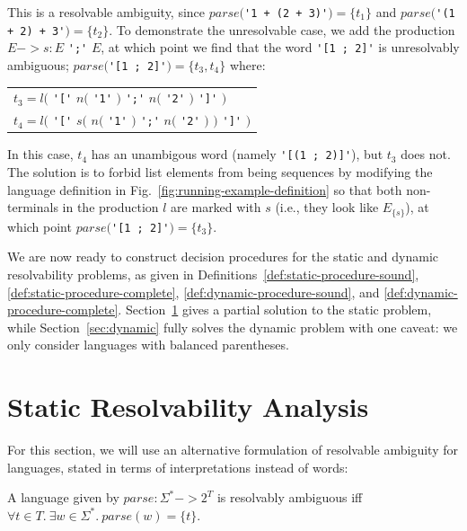 \documentclass[acmsmall,review,anonymous]{acmart}\settopmatter{printfolios=true,printccs=false,printacmref=false}
\newcommand{\T}{\Sigma} %
\newcommand{\parse}{\mathit{parse}} %
\begin{document}
\noindent This is a resolvable ambiguity, since $\parse($\verb|'1 + (2 + 3)'|$) = \{t_1\}$ and $\parse($\verb|'(1 + 2) + 3'|$) = \{t_2\}$. To demonstrate the unresolvable case, we add the production $E -> s: E$ \verb|';'| $E$, at which point we find that the word \verb|'[1 ; 2]'| is unresolvably ambiguous; $\parse($\verb|'[1 ; 2]'|$) = \{t_3, t_4\}$ where:

\begin{center}
  \begin{tabular}{l}
    $t_3 = l($ \verb|'['| \hphantom{$s($} $n($ \verb|'1'| $)$ \verb|';'| $n($ \verb|'2'| $)$ \hphantom{$)$} \verb|']'| $)$ \\
    $t_4 = l($ \verb|'['| $s($ $n($ \verb|'1'| $)$ \verb|';'| $n($ \verb|'2'| $)$ $)$ \verb|']'| $)$ \\
  \end{tabular}
\end{center}

\noindent In this case, $t_4$ has an unambigous word (namely \verb|'[(1 ; 2)]'|), but $t_3$ does not. The solution is to forbid list elements from being sequences by modifying the language definition in Fig.~\ref{fig:running-example-definition} so that both non-terminals in the production $l$ are marked with $s$ (i.e., they look like $E_{\{s\}}$), at which point $\parse($\verb|'[1 ; 2]'|$) = \{t_3\}$.

We are now ready to construct decision procedures for the static and dynamic resolvability problems, as given in Definitions~\ref{def:static-procedure-sound}, \ref{def:static-procedure-complete}, \ref{def:dynamic-procedure-sound}, and \ref{def:dynamic-procedure-complete}. Section~\ref{sec:static} gives a partial solution to the static problem, while Section~\ref{sec:dynamic} fully solves the dynamic problem with one caveat: we only consider languages with balanced parentheses.

\section{Static Resolvability Analysis} \label{sec:static}

For this section, we will use an alternative formulation of resolvable ambiguity for languages, stated in terms of interpretations instead of words:

\begin{theorem}
  A language given by $\parse : \T^{*} -> 2^T$ is resolvably ambiguous iff\\$\forall t \in T.\ \exists w \in \T^{*}.\ \parse(w) = \{t\}$.
\end{theorem}
\end{document}
